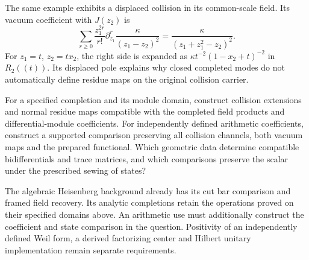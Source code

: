 The same example exhibits a displaced
collision in its common-scale field.
Its vacuum coefficient with \(J(z_2)\) is
\[
 \sum_{r\geq0}\frac{z_1^{2r}}{r!}
       \partial_{z_1}^r\frac{\kappa}{(z_1-z_2)^2}
                    =\frac{\kappa}{(z_1+z_1^2-z_2)^2}.
\]
For \(z_1=t\), \(z_2=tx_2\), the right
side is expanded as
\(\kappa t^{-2}(1-x_2+t)^{-2}\) in \(R_2((t))\).
Its displaced pole explains why closed
completed modes do not automatically define
residue maps on the original collision carrier.

\begin{question}\label{v4-q:singular-completed-geometric-comparison}
For a specified completion and its module
domain, construct collision extensions and
normal residue maps compatible with the
completed field products and differential-module
coefficients. For independently defined arithmetic
coefficients, construct a supported comparison
preserving all collision channels, both vacuum
maps and the prepared functional.
Which geometric data determine compatible
bidifferentials and trace matrices, and
which comparisons preserve the scalar
under the prescribed sewing of states?
\end{question}

The algebraic Heisenberg background already
has its cut bar comparison and framed
field recovery. Its analytic completions
retain the operations proved on their
specified domains above.
An arithmetic use must additionally construct
the coefficient and state comparison in
the question. Positivity of an independently
defined Weil form, a derived factorizing
center and Hilbert unitary implementation
remain separate requirements.
